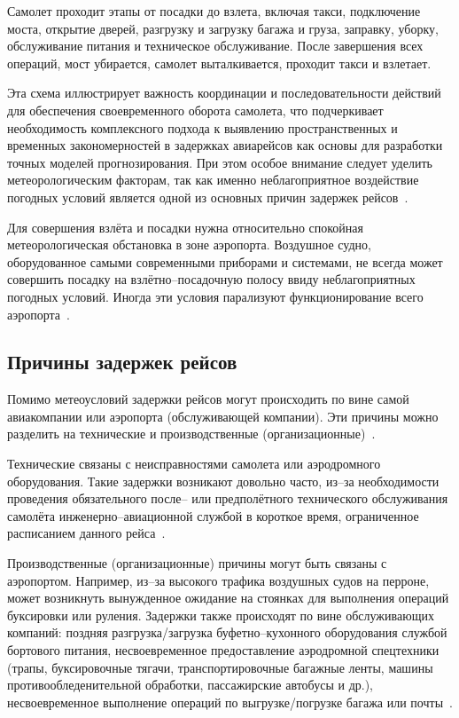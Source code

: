 Самолет проходит этапы от посадки до взлета, включая такси, подключение моста, открытие дверей, разгрузку и загрузку багажа и груза, заправку, уборку, обслуживание питания и техническое обслуживание.
После завершения всех операций, мост убирается, самолет выталкивается, проходит такси и взлетает.

Эта схема иллюстрирует важность координации и последовательности действий для обеспечения своевременного оборота самолета, что подчеркивает необходимость комплексного подхода к выявлению пространственных и временных закономерностей в задержках авиарейсов как основы для разработки точных моделей прогнозирования.
При этом особое внимание следует уделить метеорологическим факторам, так как именно неблагоприятное воздействие погодных условий является одной из основных причин задержек рейсов~\cite{trt-timeestimation}.

Для совершения взлёта и посадки нужна относительно спокойная метеорологическая обстановка в зоне аэропорта.
Воздушное судно, оборудованное самыми современными приборами и системами, не всегда может совершить посадку на взлётно--посадочную полосу ввиду неблагоприятных погодных условий.
Иногда эти условия парализуют функционирование всего аэропорта~\cite{voronov}.


\subsection*{Причины задержек рейсов}
Помимо метеоусловий задержки рейсов могут происходить по вине самой авиакомпании или аэропорта (обслуживающей компании).
Эти причины можно разделить на технические и производственные (организационные)~\cite{voronov}.

Технические связаны с неисправностями самолета или аэродромного оборудования.
Такие задержки возникают довольно часто, из--за необходимости проведения обязательного после-- или предполётного технического обслуживания самолёта инженерно--авиационной службой в короткое время, ограниченное расписанием данного рейса~\cite{voronov}.

Производственные (организационные) причины могут быть связаны с аэропортом.
Например, из--за высокого трафика воздушных судов на перроне, может возникнуть вынужденное ожидание на стоянках для выполнения операций буксировки или руления.
Задержки также происходят по вине обслуживающих компаний: поздняя разгрузка/загрузка буфетно--кухонного оборудования службой бортового питания, несвоевременное предоставление аэродромной спецтехники (трапы, буксировочные тягачи, транспортировочные багажные ленты, машины противообледенительной обработки, пассажирские автобусы и др.), несвоевременное выполнение операций по выгрузке/погрузке багажа или почты~\cite{voronov}.

